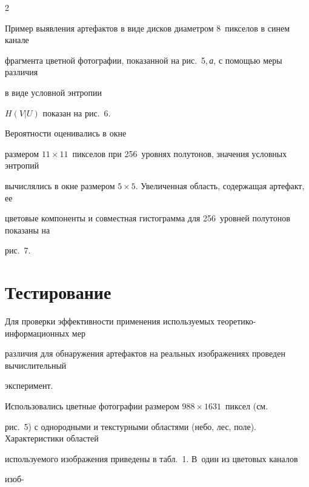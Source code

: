 \begin{multicols}{2}





  Пример выявления артефактов в виде дисков диаметром 8~пикселов в синем канале 


фрагмента цветной фотографии, показанной на рис.~5,\,\textit{а}, с помощью меры различия 


в виде условной энтропии


 $H(V\vert U)$ показан на рис.~6. 


 


 Вероятности оценивались в окне 


размером $11\times 11$~пикселов при 256~уровнях полутонов, значения условных энтропий 


вы\-чис\-ля\-лись в окне размером $5\times 5$. Увеличенная область, содержащая артефакт, ее 


цветовые компоненты и совместная гистограмма для 256~уровней полутонов показаны на 


рис.~7.








\section{Тестирование}





\vspace*{-15pt}





  Для проверки эффективности применения используемых теоретико-информационных мер 


различия для обнаружения артефактов на реальных изображениях проведен вычислительный 


эксперимент. 





Использовались цветные фотографии размером $988\times 1631$~пиксел (см.\ 


рис.~5) с однородными и текстурными областями (небо, лес, поле). Характеристики областей 


используемого изображения приведены в табл.~1. В~один из цветовых каналов


изоб-\linebreak\vspace*{-12pt}



\end{multicols}
